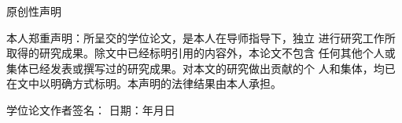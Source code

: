     \newpage
   \fancyfoot{} %
    \begin{center}
    \title[\xiaoerhao {华中师范大学\\
    学位论文原创性声明和使用授权说明}
   \vspace{0.5cm}
    \parbox[t][1cm][c]{\textwidth}{ {\bf \sanhao \kai \centerline
    {原创性声明} } }
    \parbox[t][3cm][c]{\textwidth}{\xiaosihao
    \hspace{2em}本人郑重声明：所呈交的学位论文，是本人在导师指导下，独立
    进行研究工作所取得的研究成果。除文中已经标明引用的内容外，本论文不包含
    任何其他个人或集体已经发表或撰写过的研究成果。对本文的研究做出贡献的个
    人和集体，均已在文中以明确方式标明。本声明的法律结果由本人承担。}
    \parbox[t][2cm][c]{\textwidth}{\fontsize{12pt}{15pt}\selectfont
    \hspace{2em}\fs
    学位论文作者签名：
    \hspace*{3.3cm} 日期：\hspace{2em}年\hspace{2em}月\hspace{2em}日
    }


\end{center}
